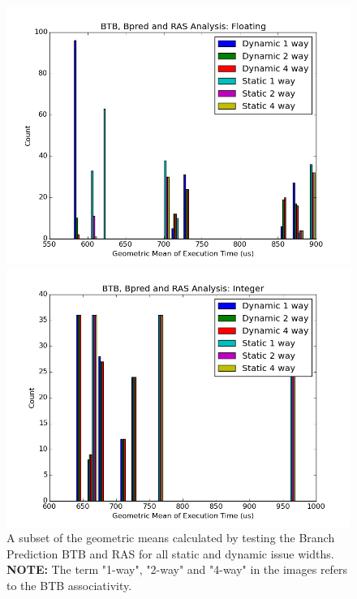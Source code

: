 \documentclass[paper=a4, fontsize=12pt]{scrartcl} %
\numberwithin{equation}{section} %
\numberwithin{figure}{section} %
\numberwithin{table}{section} %
\begin{document}
\begin{figure}
\centering
\begin{minipage}{0.5\textwidth}
\centering
	\includegraphics[width=\linewidth]{graphs/Bpred_RAS_BTB/BTB_Bpred_and_RAS_Analysis_Floating.png}
\end{minipage}\hfill
\begin{minipage}{0.5\textwidth}
\centering
 \includegraphics[width=\linewidth]{graphs/Bpred_RAS_BTB/BTB_Bpred_and_RAS_Analysis_Integer.png}
\end{minipage}

\caption{A subset of the geometric means calculated by testing the Branch Prediction BTB and RAS for all static and dynamic issue widths. \textbf{NOTE:} The term "1-way", "2-way" and "4-way" in the images refers to the BTB associativity.}
\label{fig:btbras}
\end{figure}
\end{document}
